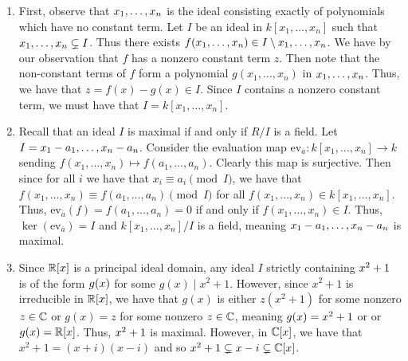 \documentclass[letterpaper, 11pt, oneside]{book}
\begin{document}
\begin{sol}\label{ex:UAG_1.1.9}
  \begin{enumerate}
    \item First, observe that $\ideal{x_{1}, \ldots, x_{n}}$ is the ideal consisting exactly of polynomials which have no constant term.
          Let $I$ be an ideal in $k[x_{1}, \ldots, x_{n}]$ such that $\ideal{x_{1}, \ldots, x_{n}} \subsetneq I$.
          Thus there exists $f(x_{1}, \ldots, x_{n}) \in I \setminus \ideal{x_{1}, \ldots, x_{n}}$.
          We have by our observation that $f$ has a nonzero constant term $z$.
          Then note that the non-constant terms of $f$ form a polynomial $g(x_{1}, \ldots, x_{n})$ in $\ideal{x_{1}, \ldots, x_{n}}$.
          Thus, we have that $z = f(x) - g(x) \in I$.
          Since $I$ contains a nonzero constant term, we must have that $I = k[x_{1}, \ldots, x_{n}]$.
    \item Recall that an ideal $I$ is maximal if and only if $R/I$ is a field.
          Let $I = \ideal{x_{1} - a_{1}, \ldots, x_{n} - a_{n}}$.
          Consider the evaluation map $\text{ev}_{\overline{a}}\colon k[x_{1}, \ldots, x_{n}] \to k$ sending $f(x_{1}, \ldots, x_{n}) \mapsto f(a_{1}, \ldots, a_{n})$.
          Clearly this map is surjective.
          Then since for all $i$ we have that $x_{i} \equiv a_{i} \pmod{I}$, we have that $f(x_{1}, \ldots, x_{n}) \equiv f(a_{1}, \ldots, a_{n}) \pmod{I}$ for all $f(x_{1}, \ldots, x_{n}) \in k[x_{1}, \ldots, x_{n}]$.
          Thus, $\text{ev}_{\overline{a}}(f) = f(a_{1}, \ldots, a_{n}) = 0$ if and only if $f(x_{1}, \ldots, x_{n}) \in I$.
          Thus, $\ker(\text{ev}_{\overline{a}}) = I$ and $k[x_{1}, \ldots, x_{n}] / I$ is a field, meaning $\ideal{x_{1} - a_{1}, \ldots, x_{n} - a_{n}}$ is maximal.
    \item Since $\mathbb{R}[x]$ is a principal ideal domain, any ideal $I$ strictly containing $\ideal{x^{2} + 1}$ is of the form $\ideal{g(x)}$ for some $g(x) \mid x^{2} + 1$.
          However, since $x^{2} + 1$ is irreducible in $\mathbb{R}[x]$, we have that $g(x)$ is either $z(x^{2} + 1)$ for some nonzero $z \in \mathbb{C}$ or $g(x) = z$ for some nonzero $z \in \mathbb{C}$, meaning $\ideal{g(x)} = \ideal{x^{2} + 1}$ or or $\ideal{g(x)} = \R[x]$.
          Thus, $\ideal{x^{2} + 1}$ is maximal.
          However, in $\mathbb{C}[x]$, we have that $x^{2} + 1 = (x + i)(x - i)$ and so $\ideal{x^{2} + 1} \subsetneq \ideal{x - i} \subsetneq \C[x]$.
  \end{enumerate}
\end{sol}
\end{document}
